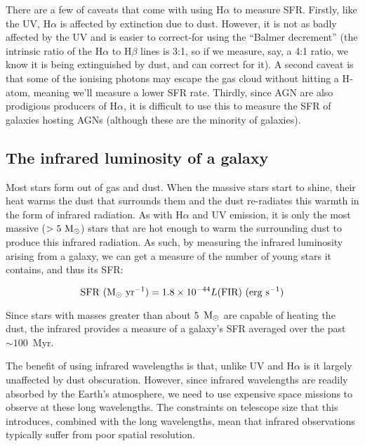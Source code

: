\documentclass[11pt]{article}
\begin{document}
There are a few of caveats that come with using H$\alpha$ to measure
SFR. Firstly, like the UV, H$\alpha$ is affected by extinction due to
dust. However, it is not as badly affected by the UV and is easier to
correct-for using the ``Balmer decrement'' (the intrinsic ratio of the
H$\alpha$ to H$\beta$ lines is 3:1, so if we measure, say, a 4:1
ratio, we know it is being extinguished by dust, and can correct for
it). A second caveat is that some of the ionising photons may escape
the gas cloud without hitting a H-atom, meaning we'll measure a lower
SFR rate. Thirdly, since AGN are also prodigious producers of
H$\alpha$, it is difficult to use this to measure the SFR of galaxies
hosting AGNs (although these are the minority of galaxies).

\subsection{The infrared luminosity of a galaxy}
Most stars form out of gas and dust. When the massive stars start to
shine, their heat warms the dust that surrounds them and the dust
re-radiates this warmth in the form of infrared radiation. As with
H$\alpha$ and UV emission, it is only the most massive
($>5~{\rm M_\odot}$) stars that are hot enough to warm the surrounding
dust to produce this infrared radiation. As such, by measuring the
infrared luminosity arising from a galaxy, we can get a measure of the
number of young stars it contains, and thus its SFR:

\begin{equation}
{\rm SFR~(M_\odot~yr^{-1})} = 1.8\times10^{-44} L(\rm FIR)~(erg~s^{-1})
\end{equation}

Since stars with masses greater than about 5~${\rm M_{\odot}}$ are
capable of heating the dust, the infrared provides a measure of a
galaxy's SFR averaged over the past $\sim100$~Myr.

The benefit of using infrared wavelengths is that, unlike UV and
H$\alpha$ is it largely unaffected by dust obscuration. However, since
infrared wavelengths are readily absorbed by the Earth's atmosphere,
we need to use expensive space missions to observe at these long
wavelengths. The constraints on telescope size that this introduces,
combined with the long wavelengths, mean that infrared observations
typically suffer from poor spatial resolution.
\end{document}
